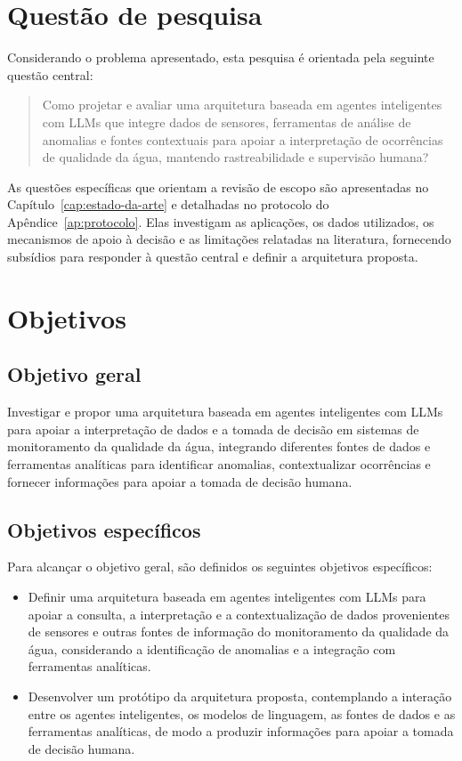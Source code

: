 \section{Questão de pesquisa}
\label{sec:questoes-pesquisa}

Considerando o problema apresentado, esta pesquisa é orientada pela seguinte questão central:

\begin{quote}
Como projetar e avaliar uma arquitetura baseada em agentes inteligentes com LLMs que integre dados de sensores, ferramentas de análise de anomalias e fontes contextuais para apoiar a interpretação de ocorrências de qualidade da água, mantendo rastreabilidade e supervisão humana?
\end{quote}

As questões específicas que orientam a revisão de escopo são apresentadas no Capítulo~\ref{cap:estado-da-arte} e detalhadas no protocolo do Apêndice~\ref{ap:protocolo}. Elas investigam as aplicações, os dados utilizados, os mecanismos de apoio à decisão e as limitações relatadas na literatura, fornecendo subsídios para responder à questão central e definir a arquitetura proposta.

\section{Objetivos}
\label{sec:objetivos}

\subsection{Objetivo geral}
\label{subsec:objetivo-geral}

Investigar e propor uma arquitetura baseada em agentes inteligentes com LLMs para apoiar a interpretação de dados e a tomada de decisão em sistemas de monitoramento da qualidade da água, integrando diferentes fontes de dados e ferramentas analíticas para identificar anomalias, contextualizar ocorrências e fornecer informações para apoiar a tomada de decisão humana.
\subsection{Objetivos específicos}
\label{subsec:objetivos-especificos}

Para alcançar o objetivo geral, são definidos os seguintes objetivos específicos:

\begin{itemize}
    \item Definir uma arquitetura baseada em agentes inteligentes com LLMs para apoiar a consulta, a interpretação e a contextualização de dados provenientes de sensores e outras fontes de informação do monitoramento da qualidade da água, considerando a identificação de anomalias e a integração com ferramentas analíticas.

    \item Desenvolver um protótipo da arquitetura proposta, contemplando a interação entre os agentes inteligentes, os modelos de linguagem, as fontes de dados e as ferramentas analíticas, de modo a produzir informações para apoiar a tomada de decisão humana.
\end{itemize}

